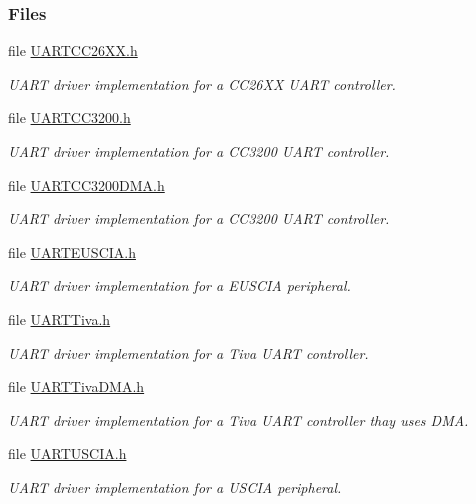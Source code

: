 \subsubsection*{Files}
\begin{DoxyCompactItemize}
\item 
file \hyperlink{_u_a_r_t_c_c26_x_x_8h}{U\-A\-R\-T\-C\-C26\-X\-X.\-h}
\begin{DoxyCompactList}\small\item\em U\-A\-R\-T driver implementation for a C\-C26\-X\-X U\-A\-R\-T controller. \end{DoxyCompactList}\item 
file \hyperlink{_u_a_r_t_c_c3200_8h}{U\-A\-R\-T\-C\-C3200.\-h}
\begin{DoxyCompactList}\small\item\em U\-A\-R\-T driver implementation for a C\-C3200 U\-A\-R\-T controller. \end{DoxyCompactList}\item 
file \hyperlink{_u_a_r_t_c_c3200_d_m_a_8h}{U\-A\-R\-T\-C\-C3200\-D\-M\-A.\-h}
\begin{DoxyCompactList}\small\item\em U\-A\-R\-T driver implementation for a C\-C3200 U\-A\-R\-T controller. \end{DoxyCompactList}\item 
file \hyperlink{_u_a_r_t_e_u_s_c_i_a_8h}{U\-A\-R\-T\-E\-U\-S\-C\-I\-A.\-h}
\begin{DoxyCompactList}\small\item\em U\-A\-R\-T driver implementation for a E\-U\-S\-C\-I\-A peripheral. \end{DoxyCompactList}\item 
file \hyperlink{_u_a_r_t_tiva_8h}{U\-A\-R\-T\-Tiva.\-h}
\begin{DoxyCompactList}\small\item\em U\-A\-R\-T driver implementation for a Tiva U\-A\-R\-T controller. \end{DoxyCompactList}\item 
file \hyperlink{_u_a_r_t_tiva_d_m_a_8h}{U\-A\-R\-T\-Tiva\-D\-M\-A.\-h}
\begin{DoxyCompactList}\small\item\em U\-A\-R\-T driver implementation for a Tiva U\-A\-R\-T controller thay uses D\-M\-A. \end{DoxyCompactList}\item 
file \hyperlink{_u_a_r_t_u_s_c_i_a_8h}{U\-A\-R\-T\-U\-S\-C\-I\-A.\-h}
\begin{DoxyCompactList}\small\item\em U\-A\-R\-T driver implementation for a U\-S\-C\-I\-A peripheral. \end{DoxyCompactList}\end{DoxyCompactItemize}
